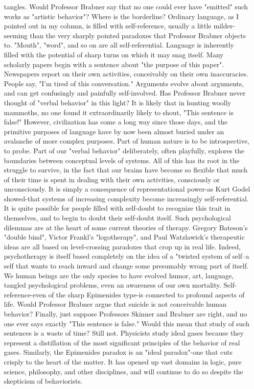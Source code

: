 tangles. Would Professor Brabner say that no one could ever have "emitted" such works as "artistic behavior"? Where is the borderline? Ordinary language, as I pointed out in my column, is filled with self-reference, usually a little milder-seeming than the very sharply pointed paradoxes that Professor Brabner objects to. "Mouth", "word", and so on are all self-referential. Language is inherently filled with the potential of sharp turns on which it may snag itself. Many scholarly papers begin with a sentence about "the purpose of this paper". Newspapers report on their own activities, conceivably on their own inaccuracies. People say, "I'm tired of this conversation." Arguments evolve about arguments, and can get confusingly and painfully self-involved. Has Professor Brabner never thought of "verbal behavior" in this light? It is likely that in hunting woolly mammoths, no one found it extraordinarily likely to shout, "This sentence is false!" However, civilization has come a long way since those days, and the primitive purposes of language have by now been almost buried under an avalanche of more complex purposes. Part of human nature is to be introspective, to probe. Part of our "verbal behavior" deliberately, often playfully, explores the boundaries between conceptual levels of systems. All of this has its root in the struggle to survive, in the fact that our brains have become so flexible that much of their time is spent in dealing with their own activities, consciously or unconsciously. It is simply a consequence of representational power-as Kurt Godel showed-that systems of increasing complexity become increasingly self-referential. It is quite possible for people filled with self-doubt to recognize this trait in themselves, and to begin to doubt their self-doubt itself. Such psychological dilemmas are at the heart of some current theories of therapy. Gregory Bateson's "double bind", Victor Frankl's "logotherapy", and Paul Watzlawick's therapeutic ideas are all based on level-crossing paradoxes that crop up in real life. Indeed, psychotherapy is itself based completely on the idea of a "twisted system of self--a self that wants to reach inward and change some presumably wrong part of itself. We human beings are the only species to have evolved humor, art, language, tangled psychological problems, even an awareness of our own mortality. Self- reference-even of the sharp Epimenides type-is connected to profound aspects of life. Would Professor Brabner argue that suicide is not conceivable human behavior? Finally, just suppose Professors Skinner and Brabner are right, and no one ever says exactly "This sentence is false." Would this mean that study of such sentences is a waste of time? Still not. Physicists study ideal gases because they represent a distillation of the most significant principles of the behavior of real gases. Similarly, the Epimenides paradox is an "ideal paradox"-one that cuts crisply to the heart of the matter. It has opened up vast domains in logic, pure science, philosophy, and other disciplines, and will continue to do so despite the skepticism of behaviorists. 
